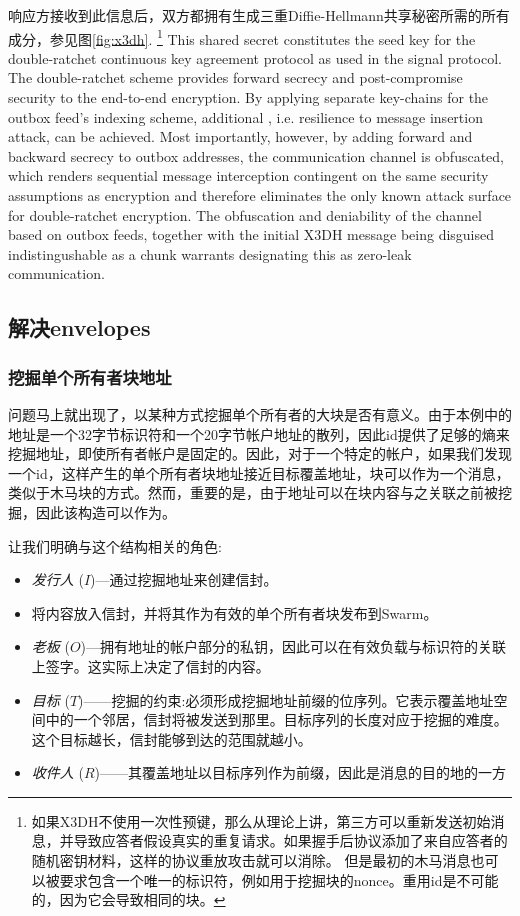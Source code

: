 响应方接收到此信息后，双方都拥有生成三重Diffie-Hellmann共享秘密所需的所有成分，参见图\ref{fig:x3dh}.%
%
\footnote{如果X3DH不使用一次性预键，那么从理论上讲，第三方可以重新发送初始消息，并导致应答者假设真实的重复请求。如果握手后协议添加了来自应答者的随机密钥材料，这样的协议重放攻击就可以消除。
但是最初的木马消息也可以被要求包含一个唯一的标识符，例如用于挖掘块的nonce。重用id是不可能的，因为它会导致相同的块。}
%
This shared secret constitutes the seed key for the double-ratchet continuous key agreement protocol as used in the signal protocol. The double-ratchet scheme provides forward secrecy and post-compromise security to the end-to-end encryption. By applying separate key-chains for the outbox feed's indexing scheme, additional , i.e. resilience to message insertion attack, can be achieved. Most importantly, however, by adding forward and backward secrecy to outbox addresses, the communication channel is obfuscated, which renders sequential message interception contingent on the same security assumptions as encryption and therefore eliminates the only known attack surface for double-ratchet encryption. The obfuscation and deniability of the channel based on outbox feeds, together with the initial X3DH message being disguised indistingushable as a chunk warrants designating this as  zero-leak communication.

\subsection{解决envelopes\statusgreen}\label{sec:addressed-envelopes}

\subsubsection{挖掘单个所有者块地址}

问题马上就出现了，以某种方式挖掘单个所有者的大块是否有意义。由于本例中的地址是一个32字节标识符和一个20字节帐户地址的散列，因此id提供了足够的熵来挖掘地址，即使所有者帐户是固定的。因此，对于一个特定的帐户，如果我们发现一个id，这样产生的单个所有者块地址接近目标覆盖地址，块可以作为一个消息，类似于木马块的方式。然而，重要的是，由于地址可以在块内容与之关联之前被挖掘，因此该构造可以作为。

让我们明确与这个结构相关的角色:

\begin{itemize}
\item \emph{发行人} ($I$)—通过挖掘地址来创建信封。 
\item 将内容放入信封，并将其作为有效的单个所有者块发布到Swarm。
\item \emph{老板} ($O$)—拥有地址的帐户部分的私钥，因此可以在有效负载与标识符的关联上签字。这实际上决定了信封的内容。
\item \emph{目标} ($T$)——挖掘的约束:必须形成挖掘地址前缀的位序列。它表示覆盖地址空间中的一个邻居，信封将被发送到那里。目标序列的长度对应于挖掘的难度。这个目标越长，信封能够到达的范围就越小。
\item \emph{收件人} ($R$)——其覆盖地址以目标序列作为前缀，因此是消息的目的地的一方
\end{itemize}

